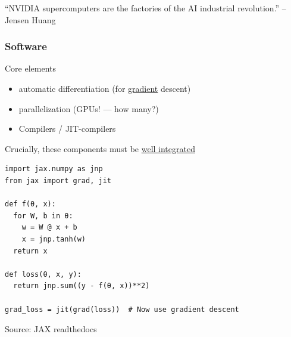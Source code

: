 \documentclass[
    xcolor={svgnames,dvipsnames},
    hyperref={colorlinks, citecolor=DeepPink4, linkcolor=DarkRed, urlcolor=DarkBlue}
    ]{beamer}  %
\newcommand{\1}{\mathbbm 1}
\begin{document}
\begin{frame} 
    
    ``NVIDIA supercomputers are the factories of the AI industrial
    revolution.'' -- Jensen Huang

\end{frame}




\begin{frame}
    \frametitle{Software}
    
    Core elements
    \begin{itemize}
        \item automatic differentiation (for \underline{gradient} descent)
        \vspace{0.5em}
        \item parallelization (GPUs! --- how many?)
        \vspace{0.5em}
        \item Compilers / JIT-compilers
    \end{itemize}

        \vspace{0.5em}
        \vspace{0.5em}
    Crucially, these components must be \underline{well integrated}


\end{frame}


\begin{frame}
    

    \begin{figure}
       \begin{center}
       \end{center}
    \end{figure}


\end{frame}


\begin{frame}[fragile]
    
    \vspace{-1em}
    \begin{verbatim}
import jax.numpy as jnp
from jax import grad, jit

def f(θ, x):
  for W, b in θ:
    w = W @ x + b
    x = jnp.tanh(w)  
  return x

def loss(θ, x, y):
  return jnp.sum((y - f(θ, x))**2)

grad_loss = jit(grad(loss))  # Now use gradient descent 
    \end{verbatim}

    {\footnotesize Source: JAX readthedocs}

\end{frame}
\end{document}
